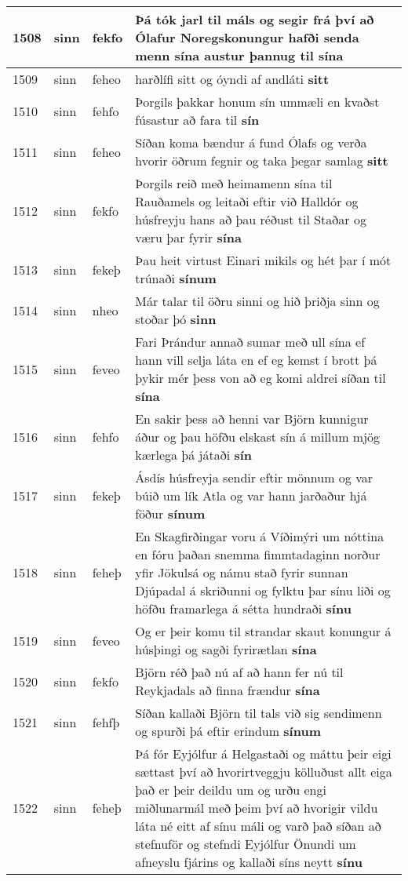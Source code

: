 \documentclass{article}
\begin{document}
\begin{longtable}{p{1cm}|p{1cm}|p{1cm}|p{13cm}}
\hline
1508&sinn&fekfo&Þá tók jarl til máls og segir frá því að Ólafur Noregskonungur hafði senda menn sína austur þannug til \textbf{sína} \\
\hline
1509&sinn&feheo&harðlífi sitt og óyndi af andláti \textbf{sitt} \\
\hline
1510&sinn&fehfo&Þorgils þakkar honum sín ummæli en kvaðst fúsastur að fara til \textbf{sín} \\
\hline
1511&sinn&feheo&Síðan koma bændur á fund Ólafs og verða hvorir öðrum fegnir og taka þegar samlag \textbf{sitt} \\
\hline
1512&sinn&fekfo&Þorgils reið með heimamenn sína til Rauðamels og leitaði eftir við Halldór og húsfreyju hans að þau réðust til Staðar og væru þar fyrir \textbf{sína} \\
\hline
1513&sinn&fekeþ&Þau heit virtust Einari mikils og hét þar í mót trúnaði \textbf{sínum} \\
\hline
1514&sinn&nheo&Már talar til öðru sinni og hið þriðja sinn og stoðar þó \textbf{sinn} \\
\hline
1515&sinn&feveo&Fari Þrándur annað sumar með ull sína ef hann vill selja láta en ef eg kemst í brott þá þykir mér þess von að eg komi aldrei síðan til \textbf{sína} \\
\hline
1516&sinn&fehfo&En sakir þess að henni var Björn kunnigur áður og þau höfðu elskast sín á millum mjög kærlega þá játaði \textbf{sín} \\
\hline
1517&sinn&fekeþ&Ásdís húsfreyja sendir eftir mönnum og var búið um lík Atla og var hann jarðaður hjá föður \textbf{sínum} \\
\hline
1518&sinn&feheþ&En Skagfirðingar voru á Víðimýri um nóttina en fóru þaðan snemma fimmtadaginn norður yfir Jökulsá og námu stað fyrir sunnan Djúpadal á skriðunni og fylktu þar sínu liði og höfðu framarlega á sétta hundraði \textbf{sínu} \\
\hline
1519&sinn&feveo&Og er þeir komu til strandar skaut konungur á húsþingi og sagði fyrirætlan \textbf{sína} \\
\hline
1520&sinn&fekfo&Björn réð það nú af að hann fer nú til Reykjadals að finna frændur \textbf{sína} \\
\hline
1521&sinn&fehfþ&Síðan kallaði Björn til tals við sig sendimenn og spurði þá eftir erindum \textbf{sínum} \\
\hline
1522&sinn&feheþ&Þá fór Eyjólfur á Helgastaði og máttu þeir eigi sættast því að hvorirtveggju kölluðust allt eiga það er þeir deildu um og urðu engi miðlunarmál með þeim því að hvorigir vildu láta né eitt af sínu máli og varð það síðan að stefnuför og stefndi Eyjólfur Önundi um afneyslu fjárins og kallaði síns neytt \textbf{sínu} \\

\end{longtable}
\end{document}
